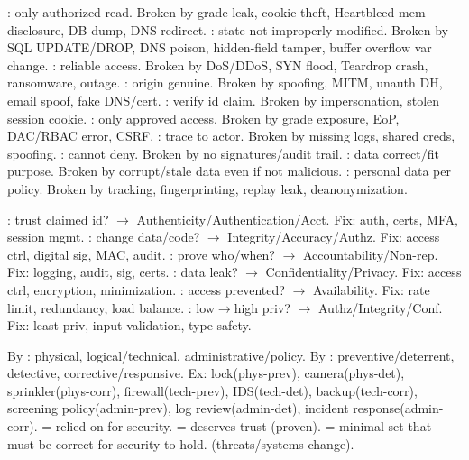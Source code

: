 : only authorized read. Broken by grade leak, cookie theft, Heartbleed mem disclosure, DB dump, DNS redirect.
: state not improperly modified. Broken by SQL UPDATE/DROP, DNS poison, hidden-field tamper, buffer overflow var change.
: reliable access. Broken by DoS/DDoS, SYN flood, Teardrop crash, ransomware, outage.
: origin genuine. Broken by spoofing, MITM, unauth DH, email spoof, fake DNS/cert.
: verify id claim. Broken by impersonation, stolen session cookie.
: only approved access. Broken by grade exposure, EoP, DAC/RBAC error, CSRF.
: trace to actor. Broken by missing logs, shared creds, spoofing.
: cannot deny. Broken by no signatures/audit trail.
: data correct/fit purpose. Broken by corrupt/stale data even if not malicious.
: personal data per policy. Broken by tracking, fingerprinting, replay leak, deanonymization.

: trust claimed id? $\to$ Authenticity/Authentication/Acct. Fix: auth, certs, MFA, session mgmt.
: change data/code? $\to$ Integrity/Accuracy/Authz. Fix: access ctrl, digital sig, MAC, audit.
: prove who/when? $\to$ Accountability/Non-rep. Fix: logging, audit, sig, certs.
: data leak? $\to$ Confidentiality/Privacy. Fix: access ctrl, encryption, minimization.
: access prevented? $\to$ Availability. Fix: rate limit, redundancy, load balance.
: low$\to$high priv? $\to$ Authz/Integrity/Conf. Fix: least priv, input validation, type safety.

By : physical, logical/technical, administrative/policy. By : preventive/deterrent, detective, corrective/responsive. Ex: lock(phys-prev), camera(phys-det), sprinkler(phys-corr), firewall(tech-prev), IDS(tech-det), backup(tech-corr), screening policy(admin-prev), log review(admin-det), incident response(admin-corr).
 = relied on for security.  = deserves trust (proven).   = minimal set that must be correct for security to hold.  (threats/systems change).

